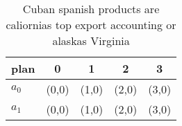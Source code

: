 \documentclass[a4paper]{article}
\begin{document}
\begin{table}
\begin{adjustbox}{width=0.5\columnwidth}
\begin{tabular}{|l|l|l|l|l|}
\hline
\textbf{plan} & \multicolumn{1}{c|}{\textbf{0}} & \multicolumn{1}{c|}{\textbf{1}} & \multicolumn{1}{c|}{\textbf{2}} & \multicolumn{1}{c|}{\textbf{3}} \\ \hline
\textbf{$a_0$}  & (0,0) & (1,0) & (2,0) & (3,0) \\ \hline
\textbf{$a_1$}  & (0,0) & (1,0) & (2,0) & (3,0) \\ \hline
\end{tabular}
\end{adjustbox}
\caption{Cuban spanish products are caliornias top export accounting or alaskas Virginia
}
\end{table}
\end{document}
